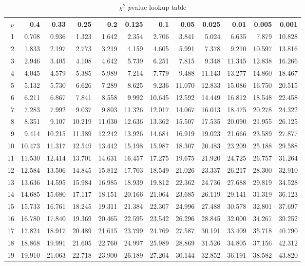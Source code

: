 \clearpage
\begin{table}
\centering
\caption{$\chi^2$ $p$value lookup table}
\begin{tabular}
      {|r||rrr|rrr|rrr|rr|}
\hline
$\nu$&0.4&0.33&0.25&0.2&0.125&0.1&0.05&0.025&0.01&0.005
     &0.001\\
    \hline\hline
1&0.708&0.936&1.323&1.642&2.354&2.706&3.841&5.024&6.635&7.879&10.828\\
2&1.833&2.197&2.773&3.219&4.159&4.605&5.991&7.378&9.210&10.597&13.816\\
3&2.946&3.405&4.108&4.642&5.739&6.251&7.815&9.348&11.345&12.838&16.266\\
4&4.045&4.579&5.385&5.989&7.214&7.779&9.488&11.143&13.277&14.860&18.467\\
5&5.132&5.730&6.626&7.289&8.625&9.236&11.070&12.833&15.086&16.750&20.515\\
\hline
6&6.211&6.867&7.841&8.558&9.992&10.645&12.592&14.449&16.812&18.548&22.458\\
7&7.283&7.992&9.037&9.803&11.326&12.017&14.067&16.013&18.475&20.278&24.322\\
8&8.351&9.107&10.219&11.030&12.636&13.362&15.507&17.535&20.090&21.955&26.125\\
9&9.414&10.215&11.389&12.242&13.926&14.684&16.919&19.023&21.666&23.589
 &27.877\\
10&10.473&11.317&12.549&13.442&15.198&15.987&18.307&20.483&23.209&25.188
  &29.588\\
\hline
11&11.530&12.414&13.701&14.631&16.457&17.275&19.675&21.920&24.725&26.757
  &31.264\\
12&12.584&13.506&14.845&15.812&17.703&18.549&21.026&23.337&26.217&28.300
  &32.910\\
13&13.636&14.595&15.984&16.985&18.939&19.812&22.362&24.736&27.688&29.819
  &34.528\\
14&14.685&15.680&17.117&18.151&20.166&21.064&23.685&26.119&29.141&31.319
  &36.123\\
15&15.733&16.761&18.245&19.311&21.384&22.307&24.996&27.488&30.578&32.801
  &37.697\\
\hline
16&16.780&17.840&19.369&20.465&22.595&23.542&26.296&28.845&32.000&34.267
  &39.252\\
17&17.824&18.917&20.489&21.615&23.799&24.769&27.587&30.191&33.409&35.718
  &40.790\\
18&18.868&19.991&21.605&22.760&24.997&25.989&28.869&31.526&34.805&37.156
  &42.312\\
19&19.910&21.063&22.718&23.900&26.189&27.204&30.144&32.852&36.191&38.582
  &43.820\\

\end{tabular}
\end{table}
